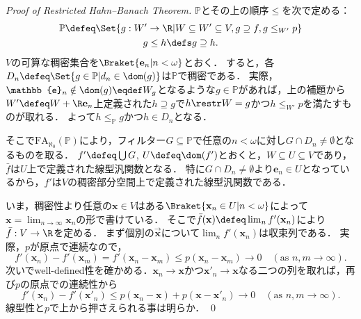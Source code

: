 \documentclass[a4j,leqno]{ltjsarticle}
\newcommand{\FA}{\mathrm{FA}}
\begin{document}
\begin{proof}[Proof of Restricted Hahn--Banach Theorem]
 $\mathbb{P}$とその上の順序$\leq$を次で定める：
 \begin{gather*}
  \mathbb{P} \defeq \Set{ g : W' \to \R | W \subseteq W' \subseteq V, g \supseteq f, g \leq_{W'} p}\\
  g \leq h \defs g \supseteq h.
 \end{gather*}
 $V$の可算な稠密集合を$\Braket{\mathbf{e}_n | n < \omega}$とおく．
 すると，各$D_n \defeq \Set{g \in \mathbb{P} | d_n \in \dom(g)}$は$\mathbb{P}$で稠密である．
 実際，$\mathbb{e}_n \notin \dom(g) \eqdef W_g$となるような$g \in \mathbb{P}$があれば，上の補題から$W' \defeq W + \R\mathbf{e}_n$上定義された$h \supseteq g$で$h \restr W = g$かつ$h \leq_{W'} p$を満たすものが取れる．
 よって$h \leq_{\mathbb{P}} g$かつ$h \in D_n$となる．

 そこで$\FA_{\aleph_0}(\mathbb{P})$により，フィルター$G \subseteq \mathbb{P}$で任意の$n < \omega$に対し$G \cap D_n \neq \emptyset$となるものを取る．
 $f' \defeq \bigcup G$, $U \defeq \dom(f')$とおくと，$W \subseteq U \subseteq V$であり，$\bar{f}$は$U$上で定義された線型汎関数となる．
 特に$G \cap D_n \neq \emptyset$より$\mathbf{e}_n \in U$となっているから，$f'$は$V$の稠密部分空間上で定義された線型汎関数である．

 いま，稠密性より任意の$\mathbf{x} \in V$はある$\Braket{\mathbf{x}_n \in U | n < \omega}$によって$\mathbf{x} = \lim_{n \to \infty} \mathbf{x}_n$の形で書けている．
 そこで$\bar{f}(\mathbf{x}) \defeq \lim_n f'(\mathbf{x}_n)$により$\bar{f}: V \to \R$を定める．
 まず個別の$\vec{\mathbf{x}}$について$\lim_n f'(\mathbf{x}_n)$は収束列である．
 実際，$p$が原点で連続なので，
 \[
    f'(\mathbf{x}_n) - f'(\mathbf{x}_m)
  = f'(\mathbf{x}_n - \mathbf{x}_m)
  \leq p(\mathbf{x}_n - \mathbf{x}_m) \to 0\quad (\text{as } n, m \to \infty).
 \]
 次いでwell-defined性を確かめる．$\mathbf{x}_n \to \mathbf{x}$かつ$\mathbf{x}'_n \to \mathbf{x}$なる二つの列を取れば，再び$p$の原点での連続性から
 \[
  f'(\mathbf{x}_n) - f'(\mathbf{x}'_n) \leq p(\mathbf{x}_n - \mathbf{x}) + p(\mathbf{x} - \mathbf{x}'_n) \to 0 \quad (\text{as } n, m \to \infty).
 \]
 線型性と$p$で上から押さえられる事は明らか． \qed
\end{proof}
\end{document}
